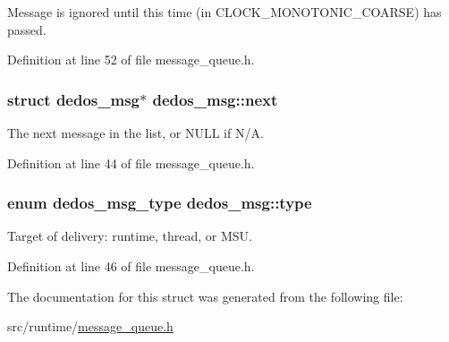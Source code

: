 Message is ignored until this time (in C\-L\-O\-C\-K\-\_\-\-M\-O\-N\-O\-T\-O\-N\-I\-C\-\_\-\-C\-O\-A\-R\-S\-E) has passed. 



Definition at line 52 of file message\-\_\-queue.\-h.

\hypertarget{structdedos__msg_ab769ff04df992859169a7a456256bd04}{
\subsubsection[{next}]{\setlength{\rightskip}{0pt plus 5cm}struct {\bf dedos\-\_\-msg}$\ast$ dedos\-\_\-msg\-::next}}\label{structdedos__msg_ab769ff04df992859169a7a456256bd04}


The next message in the list, or N\-U\-L\-L if N/\-A. 



Definition at line 44 of file message\-\_\-queue.\-h.

\hypertarget{structdedos__msg_af4d233fc84b050bee1af851fd420d317}{
\subsubsection[{type}]{\setlength{\rightskip}{0pt plus 5cm}enum {\bf dedos\-\_\-msg\-\_\-type} dedos\-\_\-msg\-::type}}\label{structdedos__msg_af4d233fc84b050bee1af851fd420d317}


Target of delivery\-: runtime, thread, or M\-S\-U. 



Definition at line 46 of file message\-\_\-queue.\-h.



The documentation for this struct was generated from the following file\-:\begin{DoxyCompactItemize}
\item 
src/runtime/\hyperlink{message__queue_8h}{message\-\_\-queue.\-h}\end{DoxyCompactItemize}
